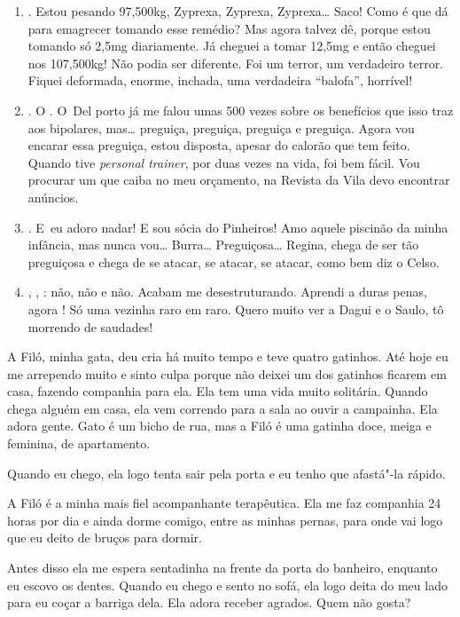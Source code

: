 \begin{enumerate}
\item
  . Estou pesando 97,500kg, Zyprexa, Zyprexa, Zyprexa…
  Saco! Como é que dá para emagrecer tomando esse remédio? Mas agora
  talvez dê, porque estou tomando só 2,5mg diariamente. Já cheguei a
  tomar 12,5mg e então cheguei nos 107,500kg! Não podia ser diferente.
  Foi um terror, um verdadeiro terror. Fiquei deformada, enorme,
  inchada, uma verdadeira ``balofa'', horrível!
\item
  .  O   . O~Del porto já me falou umas 500
  vezes sobre os benefícios que isso traz aos bipolares, mas…
  preguiça, preguiça, preguiça e preguiça. Agora vou encarar essa
  preguiça, estou disposta, apesar do calorão que tem feito. Quando tive
  \emph{personal trainer}, por duas vezes na vida, foi bem fácil. Vou
  procurar um que caiba no meu orçamento, na Revista da Vila devo
  encontrar anúncios.
\item
  . E~eu adoro nadar! E sou sócia do Pinheiros! Amo aquele piscinão
  da minha infância, mas nunca vou… Burra…
  Preguiçosa… Regina, chega de ser tão preguiçosa e chega de se
  atacar, se atacar, se atacar, como bem diz o Celso.
\item
  , \emph{}, : não, não e não. Acabam me
  desestruturando. Aprendi a duras penas, agora ! Só uma vezinha
  raro em raro. Quero muito ver a Dagui e o Saulo, tô morrendo de
  saudades!
\end{enumerate}

A Filó, minha gata, deu cria há muito tempo e teve quatro gatinhos. Até
hoje eu me arrependo muito e sinto culpa porque não deixei um dos
gatinhos ficarem em casa, fazendo companhia para ela. Ela tem uma vida
muito solitária. Quando chega alguém em casa, ela vem correndo para a
sala ao ouvir a campainha. Ela adora gente. Gato é um bicho de rua, mas
a Filó é uma gatinha doce, meiga e feminina, de apartamento.

Quando eu chego, ela logo tenta sair pela porta e eu tenho que afastá"-la
rápido.

A Filó é a minha mais fiel acompanhante terapêutica. Ela me faz
companhia 24 horas por dia e ainda dorme comigo, entre as minhas pernas,
para onde vai logo que eu deito de bruços para dormir.

Antes disso ela me espera sentadinha na frente da porta do banheiro,
enquanto eu escovo os dentes. Quando eu chego e sento no sofá, ela logo
deita do meu lado para eu coçar a barriga dela. Ela adora receber
agrados. Quem não gosta?

